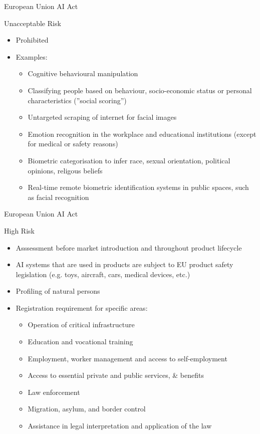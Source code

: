\documentclass[ignorenonframetext,xcolor=x11names]{beamer}
\begin{document}
\begin{frame}[label=advanced]{European Union AI Act}
\begin{block}{Unacceptable Risk}
\begin{itemize}
  \item Prohibited
  \item Examples:
	\begin{itemize}
	   \item Cognitive behavioural manipulation
	   \item Classifying people based on behaviour, socio-economic status or personal characteristics (''social scoring'')
	   \item Untargeted scraping of internet for facial images 
	   \item Emotion recognition in the workplace and educational institutions (except for medical or safety reasons)
	   \item Biometric categorisation to infer race, sexual orientation, political opinions, religous beliefs
	   \item Real-time remote biometric identification systems in public spaces, such as facial recognition
	\end{itemize}
\end{itemize}
\end{block}
\end{frame}

\begin{frame}[label=advanced]{European Union AI Act}
\begin{block}{High Risk}
\begin{itemize}
   \item Asssessment before market introduction and throughout product lifecycle
   \item AI systems that are used in products are subject to EU product safety legislation (e.g. toys, aircraft, cars, medical devices, etc.)
   \item Profiling of natural persons
   \item Registration requirement for specific areas:
	\begin{itemize}
	  \item Operation of critical infrastructure
	  \item Education and vocational training
	  \item Employment, worker management and access to self-employment
	  \item Access to essential private and public services, \& benefits
	  \item Law enforcement
	  \item Migration, asylum, and border control
	  \item Assistance in legal interpretation and application of the law
    \end{itemize}
\end{itemize}
\end{block}
\end{frame}
\end{document}
